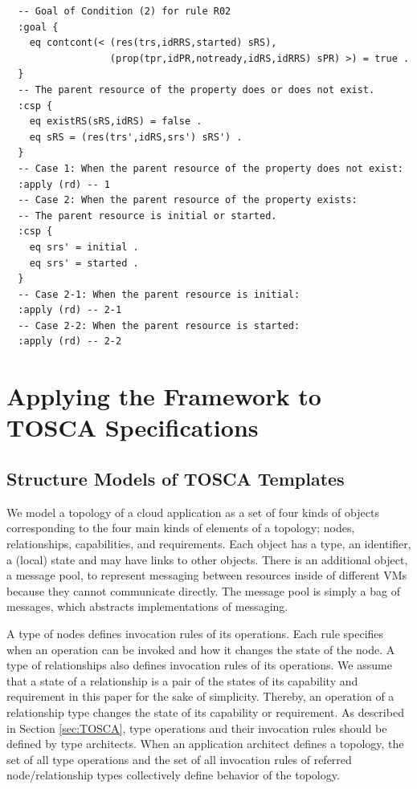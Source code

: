 \documentclass[12pt]{report}
\begin{document}
\begin{verbatim}
  -- Goal of Condition (2) for rule R02
  :goal {
    eq contcont(< (res(trs,idRRS,started) sRS),
                  (prop(tpr,idPR,notready,idRS,idRRS) sPR) >) = true .
  }
  -- The parent resource of the property does or does not exist.
  :csp {
    eq existRS(sRS,idRS) = false .
    eq sRS = (res(trs',idRS,srs') sRS') .
  }
  -- Case 1: When the parent resource of the property does not exist:
  :apply (rd) -- 1
  -- Case 2: When the parent resource of the property exists:
  -- The parent resource is initial or started.
  :csp {
    eq srs' = initial .
    eq srs' = started .
  }
  -- Case 2-1: When the parent resource is initial:
  :apply (rd) -- 2-1
  -- Case 2-2: When the parent resource is started:
  :apply (rd) -- 2-2
\end{verbatim}

\chapter{Applying the Framework to TOSCA Specifications}
\label{chap:appTOSCA}

\section{Structure Models of TOSCA Templates}
\label{sec:TOSCAstructure}
We model a topology of a cloud application as a set of four kinds of
objects corresponding to the four main kinds of elements of a
topology; nodes, relationships, capabilities, and requirements. Each
object has a type, an identifier, a (local) state and may have links
to other objects. 
There is an additional object, a message pool, to represent messaging
between resources inside of different VMs because they
cannot communicate directly. The message pool is simply a bag of
messages, which abstracts implementations of messaging.

A type of nodes defines invocation rules of its operations. Each rule
specifies when an operation can be invoked and how it changes the
state of the node.  A type of relationships also defines invocation
rules of its operations. We assume that a state of a relationship is a
pair of the states of its capability and requirement in this paper for
the sake of simplicity. Thereby, an operation of a relationship type
changes the state of its capability or requirement.  As described in
Section \ref{sec:TOSCA}, type operations and their invocation rules
should be defined by type architects. When an application architect
defines a topology, the set of all type operations and the set of all
invocation rules of referred node/relationship types collectively
define behavior of the topology.
\end{document}
